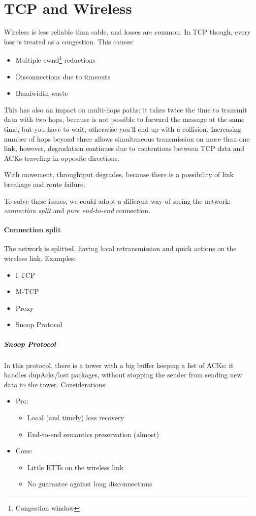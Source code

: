 \section{TCP and Wireless}

Wireless is less reliable than cable, and losses are common. In TCP though,
every loss is treated as a congestion. This causes:
\begin{itemize}
\item Multiple cwnd\footnote{Congestion window} reductions
\item Disconnections due to timeouts
\item Bandwidth waste
\end{itemize}

This has also an impact on multi-hops paths: it takes twice the time to
transmit data with two hops, because is not possible to forward the message at
the same time, but you have to wait, otherwise you'll end up with a collision.
Increasing number of hops beyond three allows simultaneous transmission on more
than one link, however, degradation continues due to contentions between TCP
data and ACKs traveling in opposite directions.

With movement, throughtput degrades, because there is a possibility of link
breakage and route failure.

To solve these issues, we could adopt a different way of seeing the network:
\textit{connection split} and \textit{pure end-to-end} connection.

\paragraph*{Connection split} The network is splitted, having local
retransmission and quick actions on the wireless link.
Examples:
\begin{itemize}
\item I-TCP
\item M-TCP
\item Proxy
\item Snoop Protocol
\end{itemize}

\subparagraph*{Snoop Protocol} In this protocol, there is a tower with a big
buffer keeping a list of ACKs: it handles dupAcks/lost packages, without
stopping the sender from sending new data to the tower.
Considerations:
\begin{itemize}
\item Pro:
  \begin{itemize}
  \item Local (and timely) loss recovery
  \item End-to-end semantics preservation (almost)
  \end{itemize}
\item Cons:
  \begin{itemize}
  \item Little RTTs on the wireless link
  \item No guarantee against long disconnections
  \end{itemize}
\end{itemize}

